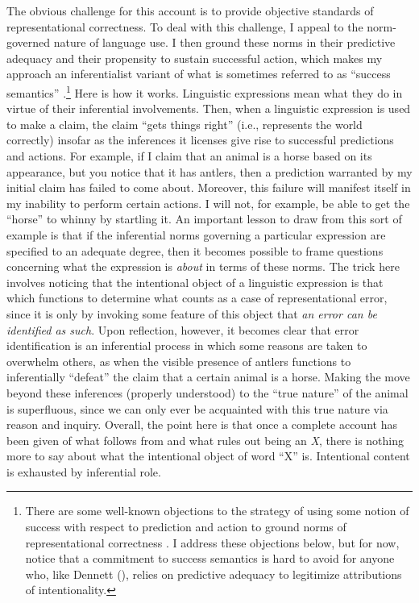 The obvious challenge for this account is to provide objective standards of representational correctness. To deal with this challenge, I appeal to the norm-governed nature of language use. I then ground these norms in their predictive adequacy and their propensity to sustain successful action, which makes my approach an inferentialist variant of what is sometimes referred to as ``success semantics'' \citep{Whyte:1990,Blackburn:2005}.\footnote{There are some well-known objections to the strategy of using some notion of success with respect to prediction and action to ground norms of representational correctness \citep{Brandom:1994b,Brandom:2011,Blackburn:2005}. I address these objections below, but for now, notice that a commitment to success semantics is hard to avoid for anyone who, like Dennett (\citeyear{Dennett:1987,Dennett:1990}), relies on predictive adequacy to legitimize attributions of intentionality.} Here is how it works. Linguistic expressions mean what they do in virtue of their inferential involvements. Then, when a linguistic expression is used to make a claim, the claim ``gets things right'' (i.e., represents the world correctly) insofar as the inferences it licenses give rise to successful predictions and actions. For example, if I claim that an animal is a horse based on its appearance, but you notice that it has antlers, then a prediction warranted by my initial claim has failed to come about. Moreover, this failure will manifest itself in my inability to perform certain actions. I will not, for example, be able to get the ``horse'' to whinny by startling it. An important lesson to draw from this sort of example is that if the inferential norms governing a particular expression are specified to an adequate degree, then it becomes possible to frame questions concerning what the expression is \textit{about} in terms of these norms. The trick here involves noticing that the intentional object of a linguistic expression is that which functions to determine what counts as a case of representational error, since it is only by invoking some feature of this object that \textit{an error can be identified as such}. Upon reflection, however, it becomes clear that error identification is an inferential process in which some reasons are taken to overwhelm others, as when the visible presence of antlers functions to inferentially ``defeat'' the claim that a certain animal is a horse. Making the move beyond these inferences (properly understood) to the ``true nature'' of the animal is superfluous, since we can only ever be acquainted with this true nature via reason and inquiry. Overall, the point here is that once a complete account has been given of what follows from and what rules out being an \textit{X}, there is nothing more to say about what the intentional object of word ``X'' is. Intentional content is exhausted by inferential role. 

